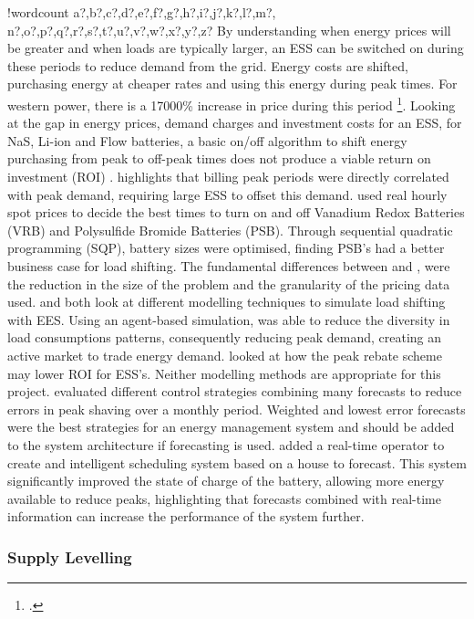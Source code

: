 \documentclass[10pt]{article}
\newcounter{words}
\newenvironment{counted}{%
  \setcounter{words}{0}
  \SearchList!{wordcount}{\stepcounter{words}}
    {a?,b?,c?,d?,e?,f?,g?,h?,i?,j?,k?,l?,m?,
    n?,o?,p?,q?,r?,s?,t?,u?,v?,w?,x?,y?,z?}
  \UndoBoundary{'}
  \SearchOrder{p;}}{%
  \StopSearching}
\begin{document}
\begin{counted}
By understanding when energy prices will be greater and when loads are
typically larger, an ESS can be switched on during these periods to
reduce demand from the grid. Energy costs are shifted, purchasing energy
at cheaper rates and using this energy during peak times. For western
power, there is a 17000\% increase in price during this period
\footcite[25.405 p/kWh in red times to 0.147p/kWh in green times][]{SWEB201492:online}.
Looking at the gap in energy prices, demand charges and investment costs
for an ESS, for NaS, Li-ion and Flow batteries, a basic on/off algorithm
to shift energy purchasing from peak to off-peak times does not produce
a viable return on investment (ROI) \cite{7555795}. \cite{7555793}
highlights that billing peak periods were directly correlated with peak
demand, requiring large ESS to offset this demand. \cite{5590194} used
real hourly spot prices to decide the best times to turn on and off
Vanadium Redox Batteries (VRB) and Polysulfide Bromide Batteries (PSB).
Through sequential quadratic programming (SQP), battery sizes were
optimised, finding PSB's had a better business case for load shifting.
The fundamental differences between \cite{5590194} and \cite{7555795},
were the reduction in the size of the problem and the granularity of the
pricing data used. \cite{shen2016} and \cite{6461115} both look at
different modelling techniques to simulate load shifting with EES. Using
an agent-based simulation, \cite{6461115} was able to reduce the
diversity in load consumptions patterns, consequently reducing peak
demand, creating an active market to trade energy demand.
\cite{shen2016} looked at how the peak rebate scheme may lower ROI for
ESS's. Neither modelling methods are appropriate for this project.
\cite{6938948} evaluated different control strategies combining many
forecasts to reduce errors in peak shaving over a monthly period.
Weighted and lowest error forecasts were the best strategies for an
energy management system and should be added to the system architecture
if forecasting is used. \cite{Bennett2015122} added a real-time operator
to create and intelligent scheduling system based on a house to
forecast. This system significantly improved the state of charge of the
battery, allowing more energy available to reduce peaks, highlighting
that forecasts combined with real-time information can increase the
performance of the system further.

\subsubsection{Supply Levelling}\label{supply-levelling}


\end{counted}
\end{document}

